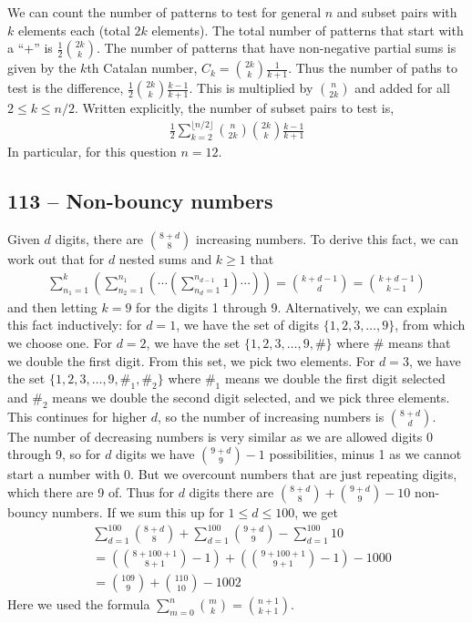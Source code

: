 \documentclass{article}
\begin{document}
We can count the number of patterns to test for general $n$ and subset pairs with $k$ elements each (total $2k$ elements). 
The total number of patterns that start with a ``+'' is $\frac{1}{2}\binom{2k}{k}$. 
The number of patterns that have non-negative partial sums is given by the $k$th Catalan number, $C_k = \binom{2k}{k} \frac{1}{k+1}$. 
Thus the number of paths to test is the difference, $\frac{1}{2}\binom{2k}{k} \frac{k-1}{k+1}$. 
This is multiplied by $\binom{n}{2k}$ and added for all $2 \leq k \leq n/2$. 
Written explicitly, the number of subset pairs to test is,
\begin{align*}
	\boxed{ \frac{1}{2}\sum_{k=2}^{\lfloor{n/2}\rfloor} \binom{n}{2k} \binom{2k}{k} \frac{k-1}{k+1} }
\end{align*}
In particular, for this question $n = 12$.


\subsection*{113 -- Non-bouncy numbers} 
Given $d$ digits, there are $\binom{8+d}{8}$ increasing numbers. 
To derive this fact, we can work out that for $d$ nested sums and $k \geq 1$ that
\begin{align*}
	\sum_{n_1=1}^k \left( \sum_{n_2=1}^{n_1} \left( \cdots \left(\sum_{n_d=1}^{n_{d-1}} 1\right) \cdots \right) \right) = \binom{k+d-1}{d} = \binom{k+d-1}{k-1}
\end{align*}
and then letting $k=9$ for the digits 1 through 9. 
Alternatively, we can explain this fact inductively: for $d=1$, we have the set of digits $\{1, 2, 3, \dotsc, 9\}$, from which we choose one. 
For $d=2$, we have the set $\{1, 2, 3, \dotsc, 9, \#\}$ where $\#$ means that we double the first digit.
From this set, we pick two elements. 
For $d=3$, we have the set $\{1, 2, 3, \dotsc, 9, \#_1, \#_2\}$ where $\#_1$ means we double the first digit selected and $\#_2$ means we double the second digit selected, and we pick three elements.
This continues for higher $d$, so the number of increasing numbers is $\binom{8+d}{d}$.\\

The number of decreasing numbers is very similar as we are allowed digits 0 through 9, so for $d$ digits we have $\binom{9+d}{9}-1$ possibilities, minus 1 as we cannot start a number with 0. 
But we overcount numbers that are just repeating digits, which there are 9 of.
Thus for $d$ digits there are $\binom{8+d}{8} + \binom{9+d}{9} - 10$ non-bouncy numbers. 
If we sum this up for $1 \leq d \leq 100$, we get 
\begin{align*}
	& \sum_{d=1}^{100} \binom{8+d}{8} + \sum_{d=1}^{100} \binom{9+d}{9} - \sum_{d=1}^{100} 10 \\
	& = \left( \binom{8+100+1}{8+1} - 1 \right) + \left( \binom{9+100+1}{9+1} - 1 \right) - 1000 \\
	& = \boxed{ \binom{109}{9} + \binom{110}{10} - 1002 }
\end{align*}
Here we used the formula $\sum\limits_{m=0}^n \binom{m}{k} = \binom{n+1}{k+1}$.
\end{document}
